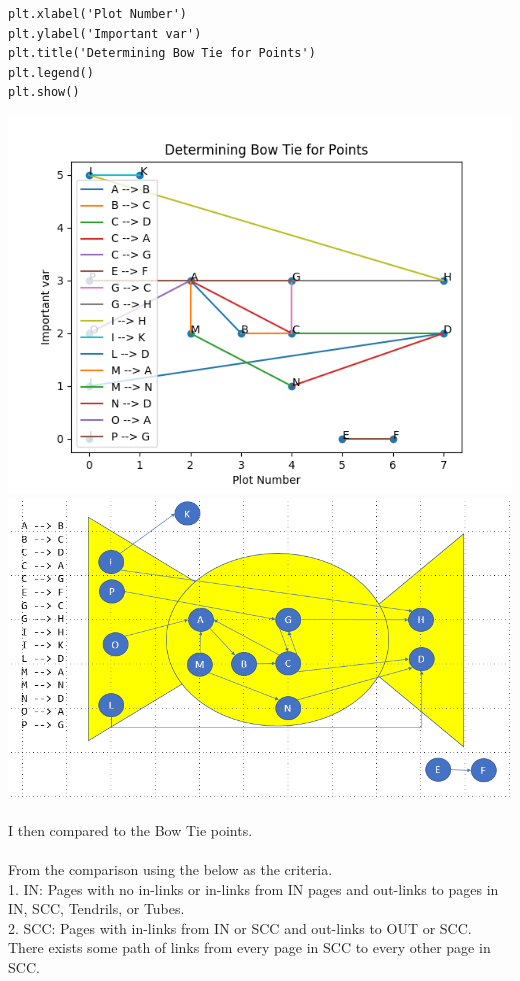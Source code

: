 \documentclass[10pt,letterpaper]{article}
\begin{document}
\begin{lstlisting}
plt.xlabel('Plot Number')
plt.ylabel('Important var')
plt.title('Determining Bow Tie for Points')
plt.legend()
plt.show()
\end{lstlisting}
\includegraphics[scale=.5]{Figure_1.png} 
\includegraphics[scale=.4]{question3.png} 
\\
\\
I then compared to the Bow Tie points.\\
\\
From the comparison using the below as the criteria.\\
    1. IN: Pages with no in-links or in-links from IN pages and out-links to pages in IN, SCC, Tendrils, or Tubes.\\ 
    2. SCC: Pages with in-links from IN or SCC and out-links to OUT or SCC. There exists some path of links from every page in SCC to every other page in SCC.\\
\end{document}
